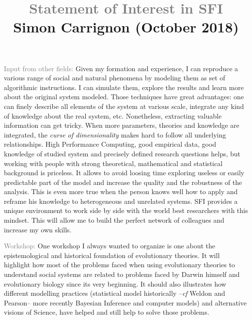 \documentclass[10pt]{article}
\title{\textcolor{grey}{\Large Statement of Interest in SFI}\\
\vspace{-.25cm}
{ \normalsize Simon Carrignon (October 2018)}}
\author{}
\date{}
\begin{document}
\maketitle

\vspace{-1cm}

\textcolor{grey}{Input from other fields:}  Given my formation and experience, I can reproduce a various range of social and natural phenomena by modeling them as set of algorithmic instructions. I can simulate them, explore the results and learn more about the original system modeled.  
Those techniques have great advantages: one can finely describe all elements of the system at various scale, integrate any kind of knowledge about the real system, etc. Nonetheless, extracting valuable information can get tricky. When more parameters, theories and knowledge are integrated, the \emph{curse of dimensionality} makes hard to follow all underlying relationships. High Performance Computing, good empirical data, good knowledge of studied system and precisely defined research questions helps, but working with people with strong theoretical, mathematical and statistical background is priceless. It allows to avoid loosing time exploring useless or easily predictable part of the model and increase the quality and the robustness of the analysis. This is even more true when the person knows well how to apply and reframe his knowledge to heterogeneous and unrelated systems. SFI provides a unique environment to work side by side with the world best researchers with this mindset. This will allow me to build the perfect network of colleagues and increase my own skills.

\vspace{.5cm}

\textcolor{grey}{Workshop:} One workshop I always wanted to organize is one about the epistemological and historical foundation of evolutionary theories. It will highlight how most of the problems faced when using evolutionary theories to understand social systems are related to problems faced by Darwin himself and evolutionary biology since its very beginning. It should also illustrates how different modelling practices (statistical model historically --\emph{cf} Weldon and Pearson\cite{weldon1893certaincorrelatedvariationsincrangonvulgaris}-- more recently Bayesian Inference and computer models) and alternative visions of Science, have helped and still help to solve those problems.

\vspace{.5cm}
\end{document}
